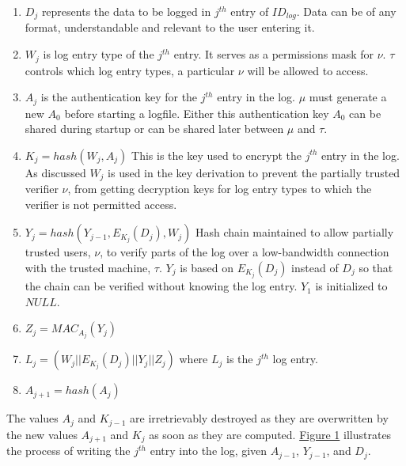 \documentclass[12pt, letter]{article}
\begin{document}
\begin{enumerate}
    \item $D_j$ represents the data to be logged in $j^{th}$ entry of $ID_{log}$. Data can be of any format, understandable and relevant to the user entering it. 
    
    \item $W_j$ is log entry type of the $j^{th}$ entry. It serves as a permissions mask for $\nu$. $\tau$ controls which log entry types, a particular $\nu$ will be allowed to access.
    
    \item  $A_j$ is the authentication key for the $j^{th}$ entry in the log. $\mu$ must generate a new $A_0$ before starting a logfile. Either this authentication key $A_0$ can be shared during startup or can be shared later between $\mu$ and $\tau$.
    
    \item $K_j = hash(W_j, A_j)$ This is the key used to encrypt the $j^{th}$ entry in the log. As discussed $W_j$ is used in the key derivation to prevent the partially trusted verifier $\nu$, from getting decryption keys for log entry types to which the verifier is not permitted access.
    
    \item $Y_j = hash(Y_{j-1}, E_{K_j}(D_j), W_j)$ Hash chain maintained to allow partially trusted users, $\nu$, to verify parts of the log over a low-bandwidth connection with the trusted machine, $\tau$. $Y_j$ is based on $E_{K_j}(D_j)$ instead of $D_j$ so that the chain can be verified without knowing the log entry. $Y_1$ is initialized to $NULL$. 
    
    \item $Z_j = MAC_{A_j}(Y_j)$
    
    \item $L_j = (W_j || E_{K_j}(D_j) || Y_j || Z_j)$ where $L_j$ is the $j^{th}$ log entry. 
    
    \item $A_{j+1} = hash(A_j)$
    
\end{enumerate}

The values $A_j$ and $K_{j-1}$ are irretrievably destroyed as they are overwritten by the new values $A_{j+1}$ and $K_j$ as soon as they are computed.  \hyperref[fig:architecture]{Figure 1} illustrates the process of writing the $j^{th}$ entry into the log, given $A_{j-1}$, $Y_{j-1}$, and $D_j$.\\
\end{document}
